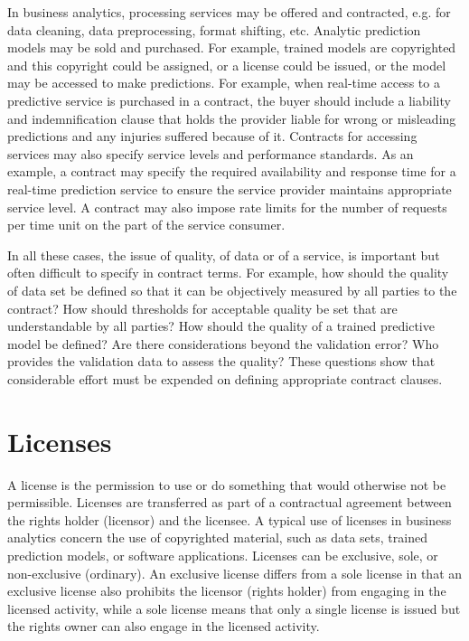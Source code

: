 In business analytics, processing services may be offered and contracted, e.g. for data cleaning, data preprocessing, format shifting, etc. Analytic prediction models may be sold and purchased. For example, trained models are copyrighted and this copyright could be assigned, or a license could be issued, or the model may be accessed to make predictions. For example, when real-time access to a predictive service is purchased in a contract, the buyer should include a liability and indemnification clause that holds the provider liable for wrong or misleading predictions and any injuries suffered because of it. Contracts for accessing services may also specify service levels and performance standards. As an example, a contract may specify the required availability and response time for a real-time prediction service to ensure the service provider maintains appropriate service level. A contract may also impose rate limits for the number of requests per time unit on the part of the service consumer.

In all these cases, the issue of quality, of data or of a service, is important but often difficult to specify in contract terms. For example, how should the quality of data set be defined so that it can be objectively measured by all parties to the contract? How should thresholds for acceptable quality be set that are understandable by all parties? How should the quality of a trained predictive model be defined? Are there considerations beyond the validation error? Who provides the validation data to assess the quality? These questions show that considerable effort must be expended on defining appropriate contract clauses. 

\section{Licenses}

A license is the permission to use or do something that would otherwise not be permissible. Licenses are transferred as part of a contractual agreement between the rights holder (licensor) and the licensee. A typical use of licenses in business analytics concern the use of copyrighted material, such as data sets, trained prediction models, or software applications. Licenses can be exclusive, sole, or non-exclusive (ordinary). An exclusive license differs from a sole license in that an exclusive license also prohibits the licensor (rights holder) from engaging in the licensed activity, while a sole license means that only a single license is issued but the rights owner can also engage in the licensed activity. 

